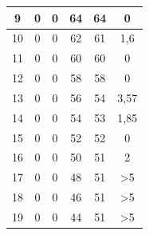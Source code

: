\begin{longtable}{|c|c|c|c|c|c|}
		9                                            & 0                      & 0                     & 64                    & 64                     & 0                                                  \\ \hline
		10                                           & 0                      & 0                     & 62                    & 61                     & 1,6                                        \\ \hline
		11                                           & 0                      & 0                     & 60                    & 60                     & 0                                                  \\ \hline
		12                                           & 0                      & 0                     & 58                    & 58                     & 0                                                  \\ \hline
		13                                           & 0                      & 0                     & 56                    & 54                     & 3,57                                      \\ \hline
		14                                           & 0                      & 0                     & 54                    & 53                     & 1,85                                       \\ \hline
		15                                           & 0                      & 0                     & 52                    & 52                     & 0                                                  \\ \hline
		16                                           & 0                      & 0                     & 50                    & 51                     & 2                                                  \\ \hline
		17                                           & 0                      & 0                     & 48                    & 51                     & >5                                               \\ \hline
		18                                           & 0                      & 0                     & 46                    & 51                     & >5                                        \\ \hline
		19                                           & 0                      & 0                     & 44                    & 51                     & >5                                        \\ \hline

\end{longtable}
